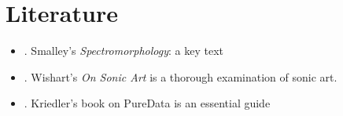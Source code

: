 
\chapter{Literature}
\label{literature}

\begin{itemize}

\item \citep{smalley_spectromorphology}. Smalley's \textit{Spectromorphology}: a key text
\item \citep{onsonicart}.  Wishart's \textit{On Sonic Art} is a thorough examination of sonic art.
\item \citep{kriedler2009puredata}. Kriedler's book on PureData is an essential guide

\end{itemize}
